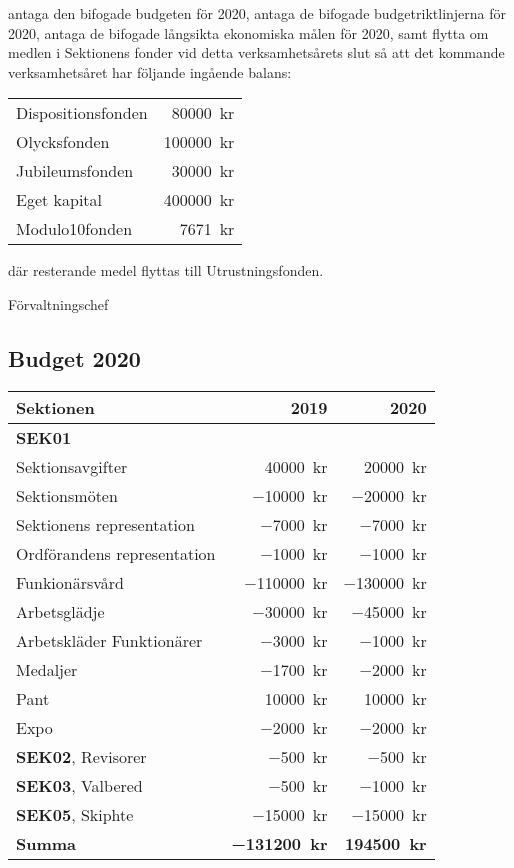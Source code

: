 \documentclass[../_main/handlingar.tex]{subfiles}
\begin{document}
\begin{attsatser}
    \att antaga den bifogade budgeten för 2020, 
    \att antaga de bifogade budgetriktlinjerna för 2020,
    \att antaga de bifogade långsikta ekonomiska målen för 2020, samt
    \att flytta om medlen i Sektionens fonder vid detta verksamhetsårets slut så att det kommande verksamhetsåret har följande ingående balans:\par
    \begin{tabular}{l r}
        Dispositionsfonden & \SI{80000}{kr}\\
        Olycksfonden & \SI{100000}{kr}\\
        Jubileumsfonden & \SI{30000}{kr}\\
        Eget kapital & \SI{400000}{kr}\\
        Modulo10fonden & \SI{7671}{kr}\\
    \end{tabular}\par
    där resterande medel flyttas till Utrustningsfonden.
\end{attsatser}

\begin{signatures}{1}
    \ist
    \signature{\fvc}{Förvaltningschef}
\end{signatures}

\newpage
\subsection*{Budget 2020}
\begin{tabularx}{10cm}{X r r}
    \textbf{\large Sektionen} & \textbf{2019} & \textbf{2020} \\
    \hline
    \textbf{SEK01} \\
    Sektionsavgifter & \SI{40000}{kr} & \SI{20000}{kr} \\
    Sektionsmöten & \SI{-10000}{kr} & \SI{-20000}{kr} \\
    Sektionens representation & \SI{-7000}{kr} & \SI{-7000}{kr} \\
    Ordförandens representation & \SI{-1000}{kr} & \SI{-1000}{kr} \\
    Funkionärsvård & \SI{-110000}{kr} & \SI{-130000}{kr} \\
    Arbetsglädje & \SI{-30000}{kr} & \SI{-45000}{kr} \\
    Arbetskläder Funktionärer & \SI{-3000}{kr} & \SI{-1000}{kr} \\
    Medaljer & \SI{-1700}{kr} & \SI{-2000}{kr} \\
    Pant & \SI{10000}{kr} & \SI{10000}{kr} \\
    Expo & \SI{-2000}{kr} & \SI{-2000}{kr} \\
    \textbf{SEK02}, Revisorer & \SI{-500}{kr} & \SI{-500}{kr} \\
    \textbf{SEK03}, Valbered & \SI{-500}{kr} & \SI{-1000}{kr} \\
    \textbf{SEK05}, Skiphte & \SI{-15000}{kr} & \SI{-15000}{kr} \\
    \hline
    \textbf{Summa} & \textbf{\SI{-131200}{kr}} & \textbf{\SI{194500}{kr}} \\
\end{tabularx}
\end{document}

